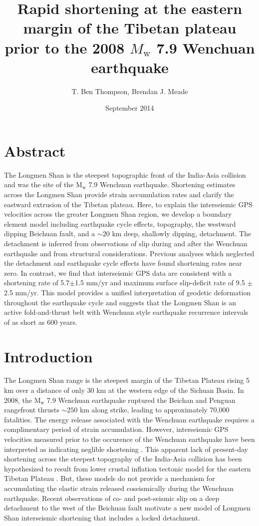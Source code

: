 \documentclass[12pt]{article}
\title{Rapid shortening at the eastern margin of the Tibetan plateau prior to the 2008 $M_\textrm{w}$ 7.9 Wenchuan earthquake}
\author{T. Ben Thompson, Brendan J. Meade}
\date{September 2014}
\begin{document}
\maketitle

\section{Abstract}
The Longmen Shan is the steepest topographic front of the India-Asia collision and was the site of the $\textrm{M}_{\textrm{w}}$ 7.9  Wenchuan earthquake. Shortening estimates across the Longmen Shan provide strain accumulation rates and clarify the eastward extrusion of the Tibetan plateau. Here, to explain the interseismic GPS velocities across the greater Longmen Shan region, we develop a boundary element model including earthquake cycle effects, topography, the westward dipping Beichuan fault, and a ${\sim}20$ km deep, shallowly dipping, detachment. The detachment is inferred from observations of slip during and after the Wenchuan earthquake and from structural considerations. Previous analyses which neglected the detachment and earthquake cycle effects have found shortening rates near zero. In contrast, we find that interseismic GPS data are consistent with a shortening rate of 5.7$\pm$1.5 mm/yr and maximum surface slip-deficit rate of 9.5 $\pm$ 2.5 mm/yr. This model provides a unified interpretation of geodetic deformation throughout the earthquake cycle and suggests that the Longmen Shan is an active fold-and-thrust belt with Wenchuan style earthquake recurrence intervals of as short as 600 years.

\section{Introduction}
The Longmen Shan range is the steepest margin of the Tibetan Plateau rising 5 km over a distance of only 30 km at the western edge of the Sichuan Basin. In 2008, the $\textrm{M}_{\textrm{w}}$ 7.9 Wenchuan earthquake ruptured the Beichan and Penguan rangefront thrusts ${\sim}250$ km along strike, leading to approximately 70,000 fatalities. The energy release associated with the Wenchuan earthquake requires a complimentary period of strain accumulation. However, interseismic GPS velocities measured prior to the occurence of the Wenchuan earthquake have been interpreted as indicating neglible shortening \citep{king97, chen00, shen05, Meade07c, Loveless2011}. This apparent lack of present-day shortening across the steepest topography of the India-Asia collision has been hypothesized to result from lower crustal inflation tectonic model for the eastern Tibetan Plateau \citep{royden97, bird91, Burchfiel2008, Clark2000}.
But, these models do not provide a mechanism for accumulating the elastic strain released coseismically during the Wenchuan earthquake. Recent observations of co- and post-seismic slip on a deep detachment to the west of the Beichuan fault\citep{Qi2011, Fielding2013b} motivate a new model of Longmen Shan interseismic shortening that includes a locked detachment.
\end{document}
